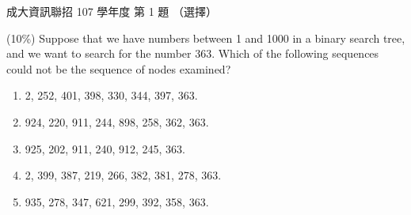 \begin{pastexam}[label={px:ncku-107-prog-01}]{成大資訊聯招 107 學年度 第 1 題}
（選擇）

(10\%) Suppose that we have numbers between 1 and 1000 in a binary search tree, and we want to
search for the number 363. Which of the following sequences could not be the sequence of nodes
examined?
\begin{enumerate}[label=\alph*.]
\item 2, 252, 401, 398, 330, 344, 397, 363.
\item 924, 220, 911, 244, 898, 258, 362, 363.
\item 925, 202, 911, 240, 912, 245, 363.
\item 2, 399, 387, 219, 266, 382, 381, 278, 363.
\item 935, 278, 347, 621, 299, 392, 358, 363.
\end{enumerate}
\end{pastexam}

